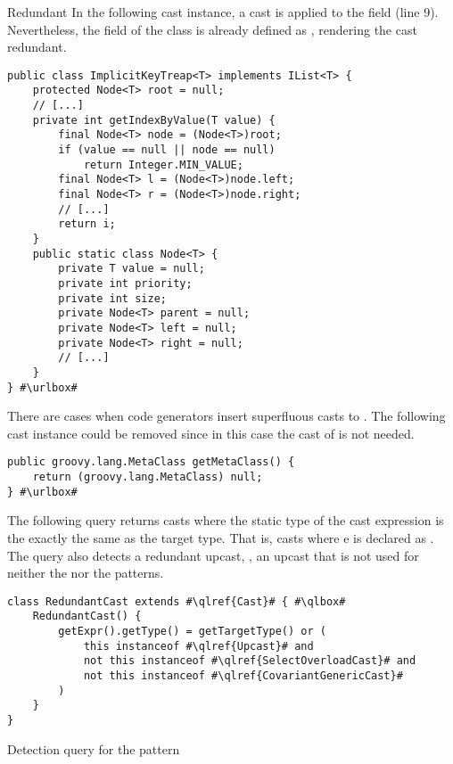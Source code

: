 \begin{pattern}{Redundant}
In the following cast instance,
a cast is applied to the  field (line 9).
Nevertheless, the  field of the  class is already defined as ,
rendering the cast redundant.

\def\urlvar{http://bit.ly/phishman3579_java_algorithms_implementation_2SGcH6w}
\begin{verbatim}
public class ImplicitKeyTreap<T> implements IList<T> {
    protected Node<T> root = null;
    // [...]
    private int getIndexByValue(T value) {
        final Node<T> node = (Node<T>)root;
        if (value == null || node == null)
            return Integer.MIN_VALUE;
        final Node<T> l = (Node<T>)node.left;
        final Node<T> r = (Node<T>)node.right;
        // [...]
        return i;
    }
    public static class Node<T> {
        private T value = null;
        private int priority;
        private int size;
        private Node<T> parent = null;
        private Node<T> left = null;
        private Node<T> right = null;
        // [...]
    }
} #\urlbox#
\end{verbatim}

There are cases when code generators insert superfluous casts to .
The following cast instance could be removed since in this case the cast of  is not needed.

\def\urlvar{http://bit.ly/togglz_togglz_2SGncXB}
\begin{verbatim}
public groovy.lang.MetaClass getMetaClass() {
    return (groovy.lang.MetaClass) null;
} #\urlbox#
\end{verbatim}


\detection{}
The following query returns casts where the static type of the cast expression is the exactly the same as the target type.
That is, casts  where e is declared as .
The query also detects a redundant upcast, \ie{},
an upcast that is not used for neither the  nor the  patterns.

\begin{listing}
\begin{verbatim}
class RedundantCast extends #\qlref{Cast}# { #\qlbox#
	RedundantCast() {
		getExpr().getType() = getTargetType() or (
			this instanceof #\qlref{Upcast}# and
			not this instanceof #\qlref{SelectOverloadCast}# and
			not this instanceof #\qlref{CovariantGenericCast}#
		)
	}
}
\end{verbatim}
\caption{Detection query for the \thisp{} pattern}
\end{listing}



\end{pattern}
